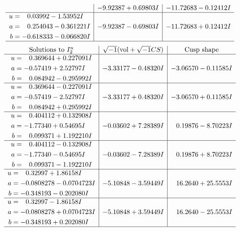 \documentclass[1p]{elsarticle_modified}
\theoremstyle{definition}
\newcommand{\I}{\sqrt{-1}}
\begin{document}
$$\begin{array}{c|c|c}
 & -9.92387 + 0.69803 I & -11.72683 - 0.12412 I \\ \hline\begin{aligned}
u &= \phantom{-}0.03992 - 1.53952 I \\
a &= \phantom{-}0.254043 - 0.361221 I \\
b &= -0.618333 - 0.066820 I\end{aligned}
 & -9.92387 - 0.69803 I & -11.72683 + 0.12412 I\\
 \hline 
 \end{array}$$\newpage$$\begin{array}{c|c|c}  
\text{Solutions to }I^u_{2}& \I (\text{vol} + \sqrt{-1}CS) & \text{Cusp shape}\\
 \hline 
\begin{aligned}
u &= \phantom{-}0.369644 + 0.227091 I \\
a &= -0.57419 + 2.52797 I \\
b &= \phantom{-}0.084942 - 0.295992 I\end{aligned}
 & -3.33177 - 0.48320 I & -3.06570 - 0.11585 I \\ \hline\begin{aligned}
u &= \phantom{-}0.369644 - 0.227091 I \\
a &= -0.57419 - 2.52797 I \\
b &= \phantom{-}0.084942 + 0.295992 I\end{aligned}
 & -3.33177 + 0.48320 I & -3.06570 + 0.11585 I \\ \hline\begin{aligned}
u &= \phantom{-}0.404112 + 0.132908 I \\
a &= -1.77340 + 0.54695 I \\
b &= \phantom{-}0.099371 + 1.192210 I\end{aligned}
 & -0.03602 + 7.28389 I & \phantom{-}0.19876 - 8.70223 I \\ \hline\begin{aligned}
u &= \phantom{-}0.404112 - 0.132908 I \\
a &= -1.77340 - 0.54695 I \\
b &= \phantom{-}0.099371 - 1.192210 I\end{aligned}
 & -0.03602 - 7.28389 I & \phantom{-}0.19876 + 8.70223 I \\ \hline\begin{aligned}
u &= \phantom{-}0.32997 + 1.86158 I \\
a &= -0.0808278 - 0.0704723 I \\
b &= -0.348193 - 0.202080 I\end{aligned}
 & -5.10848 - 3.59449 I & \phantom{-}16.2640 + 25.5553 I \\ \hline\begin{aligned}
u &= \phantom{-}0.32997 - 1.86158 I \\
a &= -0.0808278 + 0.0704723 I \\
b &= -0.348193 + 0.202080 I\end{aligned}
 & -5.10848 + 3.59449 I & \phantom{-}16.2640 - 25.5553 I\\
 \hline 
 \end{array}$$\newpage
\end{document}
